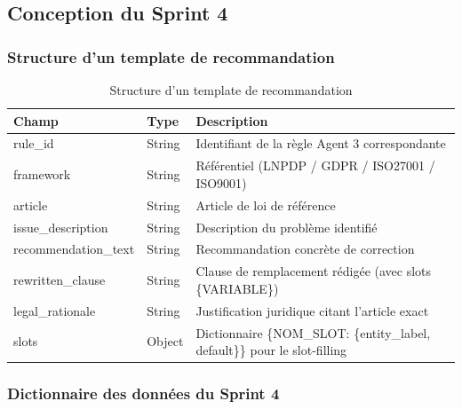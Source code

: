 \subsection{Conception du Sprint 4}

\subsubsection{Structure d'un template de recommandation}

\begin{table}[H]
\centering
\small
\renewcommand{\arraystretch}{1.2}
\begin{tabular}{|l|l|p{8.5cm}|}
\hline
\textbf{Champ} & \textbf{Type} & \textbf{Description} \\
\hline
rule\_id & String & Identifiant de la règle Agent 3 correspondante \\
framework & String & Référentiel (LNPDP / GDPR / ISO27001 / ISO9001) \\
article & String & Article de loi de référence \\
issue\_description & String & Description du problème identifié \\
recommendation\_text & String & Recommandation concrète de correction \\
rewritten\_clause & String & Clause de remplacement rédigée (avec slots \{VARIABLE\}) \\
legal\_rationale & String & Justification juridique citant l'article exact \\
slots & Object & Dictionnaire \{NOM\_SLOT: \{entity\_label, default\}\} pour le slot-filling \\
\hline
\end{tabular}
\caption{Structure d'un template de recommandation}
\label{tab:template_structure}
\end{table}

\subsubsection{Dictionnaire des données du Sprint 4}

